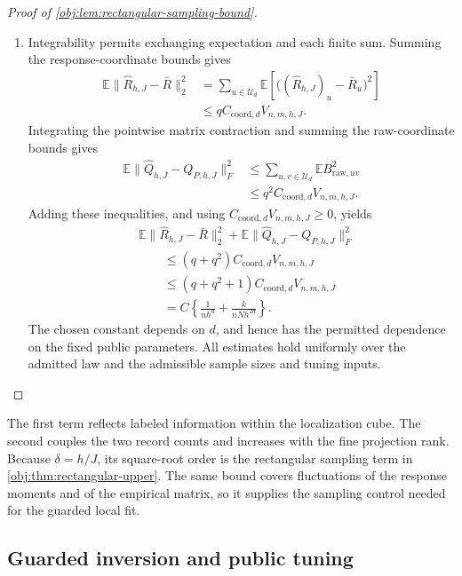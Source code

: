 \documentclass[11pt]{article}
\begin{document}
\begin{proof}[Proof of \cref{obj:lem:rectangular-sampling-bound}]
\begin{enumerate}
\item Integrability permits exchanging expectation and each finite sum. Summing the response-coordinate bounds gives
\[
\begin{aligned}
\mathbb E\|\widehat R_{h,J}-\bar R\|_2^2
&=\sum_{u\in\mathcal U_d}
 \mathbb E\left[
   \bigl((\widehat R_{h,J})_u-\bar R_u\bigr)^2
 \right]\\
&\le qC_{\mathrm{coord},d}V_{n,m,h,J}.
\end{aligned}
\]
Integrating the pointwise matrix contraction and summing the raw-coordinate bounds gives
\[
\begin{aligned}
\mathbb E\|\widehat Q_{h,J}-Q_{P,h,J}\|_F^2
&\le\sum_{u,v\in\mathcal U_d}
 \mathbb E B_{\mathrm{raw},uv}^2\\
&\le q^2C_{\mathrm{coord},d}V_{n,m,h,J}.
\end{aligned}
\]
Adding these inequalities, and using
\(C_{\mathrm{coord},d}V_{n,m,h,J}\ge0\), yields
\[
\begin{aligned}
&\mathbb E\|\widehat R_{h,J}-\bar R\|_2^2
+\mathbb E\|\widehat Q_{h,J}-Q_{P,h,J}\|_F^2\\
&\qquad\le(q+q^2)C_{\mathrm{coord},d}V_{n,m,h,J}\\
&\qquad\le(q+q^2+1)C_{\mathrm{coord},d}V_{n,m,h,J}\\
&\qquad=C\left\{\frac1{nh^d}+\frac{k}{nNh^{2d}}\right\}.
\end{aligned}
\]
The chosen constant depends on \(d\), and hence has the permitted dependence on the fixed public parameters. All estimates hold uniformly over the admitted law and the admissible sample sizes and tuning inputs.
\end{enumerate}
\end{proof}

The first term reflects labeled information within the localization cube. The second couples the two record counts and increases with the fine projection rank. Because \(\delta=h/J\), its square-root order is the rectangular sampling term in \cref{obj:thm:rectangular-upper}. The same bound covers fluctuations of the response moments and of the empirical matrix, so it supplies the sampling control needed for the guarded local fit.

\subsection{Guarded inversion and public tuning}
\end{document}
